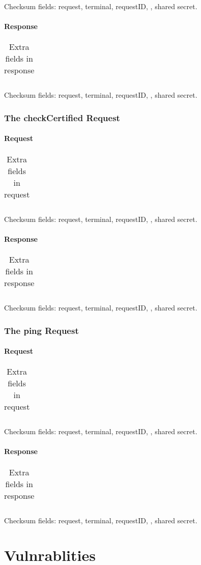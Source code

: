 \documentclass[a4paper,11pt]{article}
\newcommand{\code}[1]
   {\textsf{\mbox{#1}}}
\newcommand{\rightcellwidth}{25em}
\newcommand{\reqsection}[1]
    {\subsubsection{The \code{#1} Request}}
\newcommand{\partsection}[1]
           {\paragraph{#1}}
\begin{document}
Checksum fields: request, terminal, requestID, , shared secret.

\partsection{Response}
\begin{table}[!ht]
  \begin{tabular}{|l|p{\rightcellwidth}|}
    \hline
       \\\hline
  \end{tabular} 
  \caption{Extra fields in \code{} response}
\end{table}

Checksum fields: request, terminal, requestID, , shared secret.




\reqsection{checkCertified}

\partsection{Request}
\begin{table}[!ht]
  \begin{tabular}{|l|p{\rightcellwidth}|}
    \hline
       \\\hline
  \end{tabular} 
  \caption{Extra fields in \code{} request}
\end{table}

Checksum fields: request, terminal, requestID, , shared secret.

\partsection{Response}
\begin{table}[!ht]
  \begin{tabular}{|l|p{\rightcellwidth}|}
    \hline
       \\\hline
  \end{tabular} 
  \caption{Extra fields in \code{} response}
\end{table}

Checksum fields: request, terminal, requestID, , shared secret.




\reqsection{ping}

\partsection{Request}
\begin{table}[!ht]
  \begin{tabular}{|l|p{\rightcellwidth}|}
    \hline
       \\\hline
  \end{tabular} 
  \caption{Extra fields in \code{} request}
\end{table}

Checksum fields: request, terminal, requestID, , shared secret.

\partsection{Response}
\begin{table}[!ht]
  \begin{tabular}{|l|p{\rightcellwidth}|}
    \hline
       \\\hline
  \end{tabular} 
  \caption{Extra fields in \code{} response}
\end{table}

Checksum fields: request, terminal, requestID, , shared secret.



\section{Vulnrablities}
\end{document}
